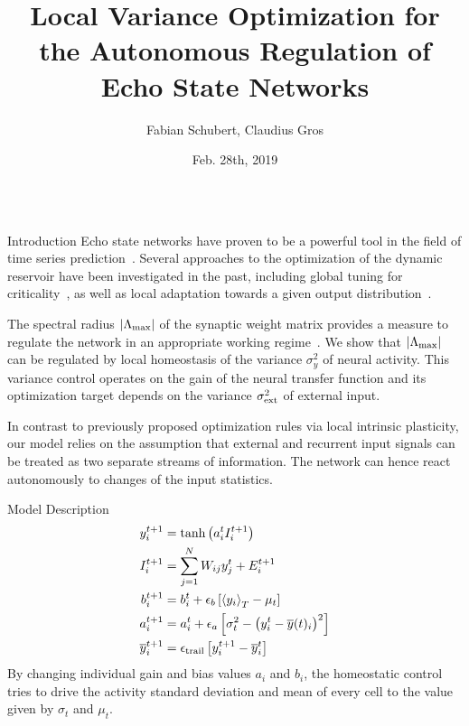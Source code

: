 \documentclass{beamer}
\title{Local Variance Optimization for the Autonomous Regulation of Echo State Networks}
\author{Fabian Schubert, Claudius Gros}
\institute{Institute for Theoretical Physics, Goethe University Frankfurt a.M.}
\date{Feb. 28th, 2019}
\newcommand{\avgt}[1]{\left< #1 \right>_T}
\begin{document}
\begin{frame}[t]
\begin{columns}[t]
\begin{column}{.4\textwidth}
\begin{myblock}{Introduction}
Echo state networks have proven to be a powerful tool in the field of time series prediction~\citep{Jaeger_2001,Lukosevicius_2009}. Several approaches to the optimization of the dynamic reservoir have been investigated in the past, including global tuning for criticality~\cite{Livi_2016}, as well as local adaptation towards a given output distribution~\cite{Schrauwen_2008,Boedecker_2009}.

The spectral radius $|\Lambda_{\rm max}|$ of the synaptic weight matrix provides a measure to regulate the network in an appropriate working regime~\cite{Caluwaerts_2013}. We show that $|\Lambda_{\rm max}|$ can be regulated by local homeostasis of the variance $\sigma_y^2$ of neural activity. This variance control operates on the gain of the neural transfer function and its optimization target depends on the variance $\sigma_{\rm ext}^2$ of external input.

In contrast to previously proposed optimization rules via local intrinsic plasticity, our model relies on the assumption that external and recurrent input signals can be treated as two separate streams of information. The network can hence react autonomously to changes of the input statistics.
\end{myblock}

\begin{myblock}{Model Description}
\begin{align}
y_i^{t+1} &= \mathrm{tanh}\left( a_i^t I_i^{t+1} \right) \label{eq:reserv_dynamics}\\
I_i^{t+1} &= \sum_{j=1}^{N} W_{ij} y_j^t + E_i^{t+1} \label{eq:input_dynamics} \\
b_i^{t+1} &= b_i^t + \epsilon_{b} \left[ \avgt{y_i} - \mu_{t} \right] \\
a_i^{t+1} &= a_i^{t} + \epsilon_{a} \left[ \sigma_{t}^2 - \left( y_i^t - \overline{y}(t)_i\right)^2 \right] \label{eq:gain_dynamcis} \\
\overline{y}^{t+1}_i &= \epsilon_{\rm trail} \left[ y_i^{t+1} - \overline{y}^{t}_i\right]
\end{align}
By changing individual gain and bias values $a_i$ and $b_i$, the homeostatic control tries to drive the activity standard deviation and mean of every cell to the value given by $\sigma_{t}$ and $\mu_{t}$.
\end{myblock}


\end{column}
\end{columns}
\end{frame}
\end{document}
